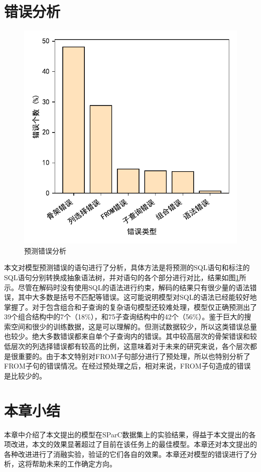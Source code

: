 \section{错误分析}

\begin{figure}
    \includegraphics[width=\linewidth]{figure/error.pdf}
    \caption{预测错误分析}
    \label{error}
\end{figure}

本文对模型预测错误的语句进行了分析，具体方法是将预测的SQL语句和标注的SQL语句分别转换成抽象语法树，并对语句的各个部分进行对比，结果如图\ref{error}所示。尽管在解码时没有使用SQL的语法进行约束，解码的结果只有很少量的语法错误，其中大多数是括号不匹配等错误。这可能说明模型对SQL的语法已经能较好地掌握了。对于包含组合和子查询的复杂语句模型还较难处理，模型仅正确预测出了39个组合结构中的7个（18\%），和75子查询结构中的42个（56\%）。鉴于巨大的搜索空间和很少的训练数据，这是可以理解的。但测试数据较少，所以这类错误总量也较少。绝大多数错误都来自单个子查询内的错误。其中较高层次的骨架错误和较低层次的列选择错误都有较高的比例，这意味着对于未来的研究来说，各个层次都是很重要的。由于本文特别对FROM子句部分进行了预处理，所以也特别分析了FROM子句的错误情况。在经过预处理之后，相对来说，FROM子句造成的错误是比较少的。

\section{本章小结}

本章中介绍了本文提出的模型在SParC数据集上的实验结果，得益于本文提出的各项改进，本文的效果显著超过了目前在该任务上的最佳模型。本章还对本文提出的各种改进进行了消融实验，验证的它们各自的效果。本章还对模型的错误进行了分析，这将帮助未来的工作确定方向。
